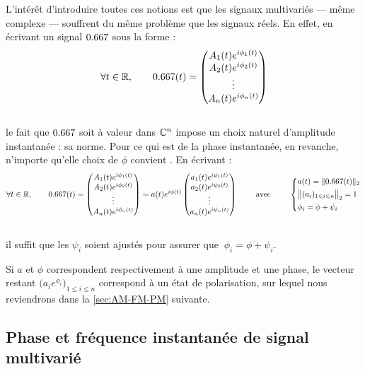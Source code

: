 L'intérêt d'introduire toutes ces notions est que les signaux multivariés --- même complexe --- souffrent du même problème que les signaux réels. 
En effet, en écrivant un signal $\x$ sous la forme :
\[\forall t\in\R,\qquad 
\x(t) = \begin{pmatrix} A_1(t)e^{i\phi_1(t)} \\ A_2(t)e^{i\phi_2(t)} \\ \vdots \\ A_n(t)e^{i\phi_n(t)}
\end{pmatrix}\]
\\
le fait que $\x$ soit à valeur dans $\mathbb{C}^n$ impose un choix naturel d'amplitude instantanée : sa norme. Pour ce qui est de la phase instantanée, en revanche, n'importe qu'elle choix de $\phi$ convient \apriori. En écrivant :
\[\forall t\in\R,\qquad 
\x(t) = \begin{pmatrix} A_1(t)e^{i\phi_1(t)} \\ A_2(t)e^{i\phi_2(t)} \\ \vdots \\ A_n(t)e^{i\phi_n(t)} \end{pmatrix}
= a(t)e^{i\phi(t)}\begin{pmatrix} a_1(t)e^{i\psi_1(t)} \\ a_2(t)e^{i\psi_2(t)} \\ \vdots \\ a_n(t)e^{i\psi_n(t)} \end{pmatrix}
\qquad\text{ avec }\qquad 
\left\{ \begin{aligned}
	& a(t) = \| \x(t) \|_2 \\
	& \big\|(a_i)_{1\leq i\leq n}\big\|_2 = 1 \\
	& \phi_i = \phi + \psi_i \end{aligned}\right.\]
\\
il suffit que les $\psi_i$ soient ajustés pour assurer que $\ \phi_i = \phi + \psi_i$.
\\
\begin{remarque}
	Si $a$ et $\phi$ correspondent respectivement à une amplitude et une phase, le vecteur restant $\big( a_ie^{\phi_i} \big)_{1\leq i\leq n}$ correspond à un état de polarisation, sur lequel nous reviendrons dans la \cref{sec:AM-FM-PM} suivante.
\end{remarque}
\skipl




\subsection{Phase et fréquence instantanée de signal multivarié }\label{subsec:intro_phased}

